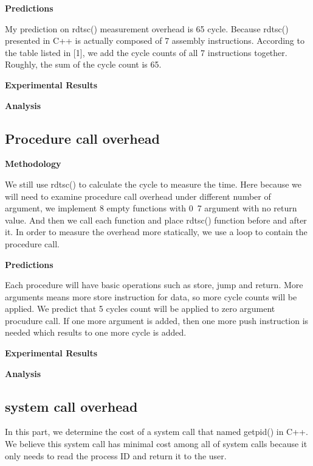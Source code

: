\noindent\textbf{Predictions}

My prediction on rdtsc() measurement overhead is 65 cycle. Because rdtsc() presented in C++ is actually composed of 7 assembly instructions. According to the table listed in [1], we add the cycle counts of all 7 instructions together. Roughly, the sum of the cycle count is 65.

\noindent\textbf{Experimental Results}



\noindent\textbf{Analysis}


\subsection{Procedure call overhead}

\noindent\textbf{Methodology}

We still use rdtsc() to calculate the cycle to measure the time. Here because we will need to examine procedure call overhead under different number of argument, we implement 8 empty functions with 0~7 argument with no return value. And then we call each function and place rdtsc() function before and after it. In order to measure the overhead more statically, we use a loop to contain the procedure call.


\noindent\textbf{Predictions}

Each procedure will have basic operations such as store, jump and return. More arguments means more store instruction for data, so more cycle counts will be applied. We predict that 5 cycles count will be applied to zero argument procudure call. If one more argument is added, then one more push instruction is needed which results to one more cycle is added.

\noindent\textbf{Experimental Results}


\noindent\textbf{Analysis}


\subsection{system call overhead}

In this part, we determine the cost of a system call that named getpid() in C++. We believe this system call has minimal cost among all of system calls because it only needs to read the process ID and return it to the user.

